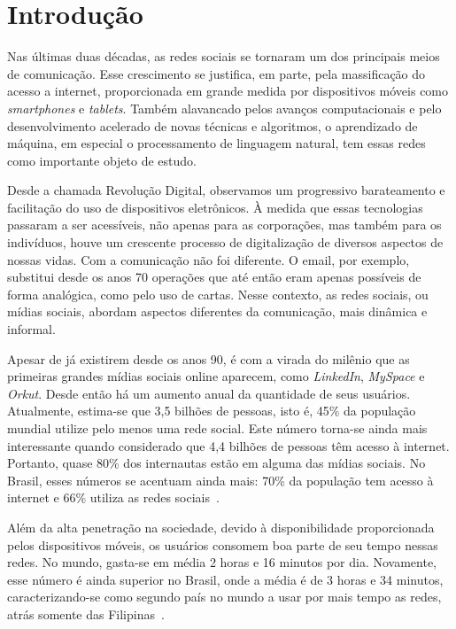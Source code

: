 \chapter{Introdução}
\label{chapter:intro}

Nas últimas duas décadas, as redes sociais se tornaram um dos principais meios de
comunicação.
Esse crescimento se justifica, em parte, pela massificação do acesso a internet,
proporcionada em grande medida por dispositivos móveis como \textit{smartphones}
e \textit{tablets}.
Também alavancado pelos avanços computacionais e pelo desenvolvimento acelerado
de novas técnicas e algoritmos, o aprendizado de máquina, em especial o
processamento de linguagem natural, tem essas redes como importante objeto de
estudo.

Desde a chamada Revolução Digital, observamos um progressivo barateamento e
facilitação do uso de dispositivos eletrônicos.
À medida que essas tecnologias passaram a ser acessíveis, não apenas para as
corporações, mas também para os indivíduos, houve um crescente processo de
digitalização de diversos aspectos de nossas vidas.
Com a comunicação não foi diferente.
O email, por exemplo, substitui desde os anos 70 operações que até então eram
apenas possíveis de forma analógica, como pelo uso de cartas.
Nesse contexto, as redes sociais, ou mídias sociais, abordam aspectos diferentes
da comunicação, mais dinâmica e informal.

Apesar de já existirem desde os anos 90, é com a virada do milênio que as
primeiras grandes mídias sociais online aparecem, como \textit{LinkedIn},
\textit{MySpace} e \textit{Orkut}.
Desde então há um aumento anual da quantidade de seus usuários.
Atualmente, estima-se que 3,5 bilhões de pessoas, isto é, 45\% da população mundial
utilize pelo menos uma rede social.
Este número torna-se ainda mais interessante quando considerado que 4,4 bilhões
de pessoas têm acesso à internet.
Portanto, quase 80\% dos internautas estão em alguma das mídias sociais.
No Brasil, esses números se acentuam ainda mais: 70\% da população tem
acesso à internet e 66\% utiliza as redes sociais~\cite{social19}.

Além da alta penetração na sociedade, devido à disponibilidade proporcionada
pelos dispositivos móveis, os usuários consomem boa parte de seu tempo nessas
redes.
No mundo, gasta-se em média 2 horas e 16 minutos por dia.
Novamente, esse número é ainda superior no Brasil, onde a média é de 3 horas e
34 minutos, caracterizando-se como segundo país no mundo a usar por mais tempo
as redes, atrás somente das Filipinas~\cite{social19}.

